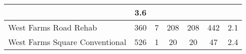 {\begin{tabular}{l|c|c|c|c|c|c|}
                                    & 3.6                                                                \\ \hline\multicolumn{1}{|l|}{\cellcolor{ccteallight}West Farms Road Rehab}        & 360                                                   & 7                            & 208                                                   & 208                                                           & 442                                                                & 2.1                                                                \\ \hline\multicolumn{1}{|l|}{\cellcolor{ccteallight}West Farms Square Conventional}        & 526                                                   & 1                            & 20                                                   & 20                                                           & 47                                                                & 2.4                                                                \\ \hline
    \end{tabular}
    }
    